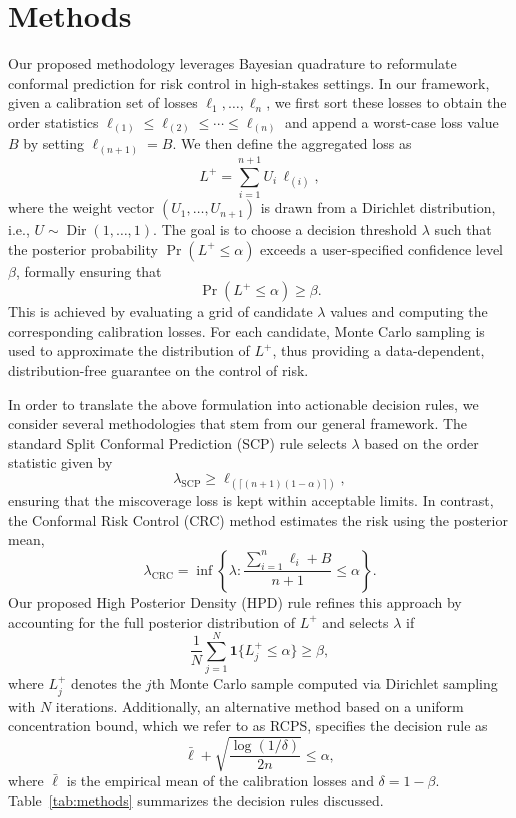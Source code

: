 \documentclass{article}
\begin{document}
\section{Methods}
Our proposed methodology leverages Bayesian quadrature to reformulate conformal prediction for risk control in high-stakes settings. In our framework, given a calibration set of losses \(\ell_1, \dots, \ell_n\), we first sort these losses to obtain the order statistics \(\ell_{(1)} \le \ell_{(2)} \le \cdots \le \ell_{(n)}\) and append a worst-case loss value \(B\) by setting \(\ell_{(n+1)} = B\). We then define the aggregated loss as 
\[
L^+ = \sum_{i=1}^{n+1} U_i \, \ell_{(i)},
\]
where the weight vector \((U_1, \dots, U_{n+1})\) is drawn from a Dirichlet distribution, i.e., \(U \sim \operatorname{Dir}(1,\ldots,1)\). The goal is to choose a decision threshold \(\lambda\) such that the posterior probability \(\Pr(L^+ \le \alpha)\) exceeds a user-specified confidence level \(\beta\), formally ensuring that
\[
\Pr(L^+ \le \alpha) \ge \beta.
\]
This is achieved by evaluating a grid of candidate \(\lambda\) values and computing the corresponding calibration losses. For each candidate, Monte Carlo sampling is used to approximate the distribution of \(L^+\), thus providing a data-dependent, distribution-free guarantee on the control of risk.

In order to translate the above formulation into actionable decision rules, we consider several methodologies that stem from our general framework. The standard Split Conformal Prediction (SCP) rule selects \(\lambda\) based on the order statistic given by 
\[
\lambda_{\text{SCP}} \ge \ell_{(\lceil (n+1)(1-\alpha) \rceil)},
\]
ensuring that the miscoverage loss is kept within acceptable limits. In contrast, the Conformal Risk Control (CRC) method estimates the risk using the posterior mean,
\[
\lambda_{\text{CRC}} = \inf\left\{\lambda : \frac{\sum_{i=1}^n \ell_i + B}{n+1} \le \alpha\right\}.
\]
Our proposed High Posterior Density (HPD) rule refines this approach by accounting for the full posterior distribution of \(L^+\) and selects \(\lambda\) if
\[
\frac{1}{N}\sum_{j=1}^N \mathbf{1}\{L^+_j \le \alpha\} \ge \beta,
\]
where \(L^+_j\) denotes the \(j\)th Monte Carlo sample computed via Dirichlet sampling with \(N\) iterations. Additionally, an alternative method based on a uniform concentration bound, which we refer to as RCPS, specifies the decision rule as
\[
\bar{\ell} + \sqrt{\frac{\log(1/\delta)}{2n}} \le \alpha,
\]
where \(\bar{\ell}\) is the empirical mean of the calibration losses and \(\delta = 1-\beta\). Table~\ref{tab:methods} summarizes the decision rules discussed.
\end{document}
